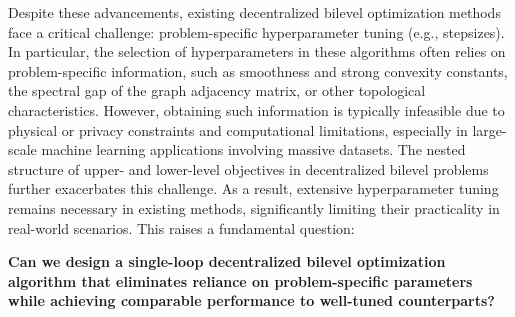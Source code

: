 \documentclass{article}
\theoremstyle{plain}
\theoremstyle{definition}
\theoremstyle{remark}
\begin{document}
Despite these advancements, existing decentralized bilevel optimization methods face a critical challenge: problem-specific hyperparameter tuning (e.g., stepsizes). In particular, the selection of hyperparameters in these algorithms often relies on problem-specific information, such as smoothness and strong convexity constants, the spectral gap of the graph adjacency matrix, or other topological characteristics. However, obtaining such information is typically infeasible due to physical or privacy constraints and computational limitations, especially in large-scale machine learning applications involving massive datasets. The nested structure of upper- and lower-level objectives in decentralized bilevel problems further exacerbates this challenge. As a result, extensive hyperparameter tuning remains necessary in existing methods, significantly limiting their practicality in real-world scenarios. This raises a fundamental question: 
\vspace{-0.2cm}
\begin{tcolorbox}[colback=gray!5,
    colframe=black!70, 
    frame style={line width=10pt}, arc=2mm  ]
\textbf{Can we design a single-loop decentralized bilevel optimization algorithm that eliminates reliance on problem-specific parameters while achieving comparable performance to well-tuned counterparts?
}
\end{tcolorbox}
\vspace{-0.3cm}
\end{document}

